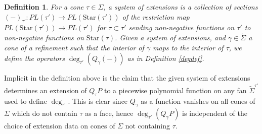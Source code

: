 \documentclass[12pt, oneside]{amsart}   	%
\newcounter{thm}
\newtheorem{definition}[thm]{Definition}
\numberwithin{equation}{section}
\numberwithin{thm}{section}
\numberwithin{figure}{section}
\begin{document}
%
\begin{definition}
For a cone $\tau \in \Sigma$, a system of extensions is a collection of sections $(-)_{\tau'}: PL(\tau') \rightarrow PL(\text{Star}(\tau'))$ of the restriction map $PL(\text{Star}(\tau')) \rightarrow PL(\tau')$ for $\tau \subset \tau'$ sending non-negative functions on $\tau'$ to non-negative functions on $\text{Star}(\tau)$. Given a system of extensions, and $\gamma \in \widetilde{\Sigma}$ a cone of a refinement such that the interior of $\gamma$ maps to the interior of $\tau$, we define the operators $\deg_{\tau'}(Q_{\gamma}(-))$ as in Definition \ref{degdef}. 
\end{definition}

Implicit in the definition above is the claim that the given system of extensions determines an extension of $Q_{\tau}P$ to a piecewise polynomial function on any fan $\widetilde{\Sigma}^{\tau'}$ used to define $\deg_{\tau'}$. This is clear since $Q_{\gamma}$ as a function vanishes on all cones of $\Sigma$ which do not contain $\tau$ as a face, hence $\deg_{\tau'}(Q_{\gamma}P)$ is independent of the choice of extension data on cones of $\Sigma$ not containing $\tau$. 
\end{document}
